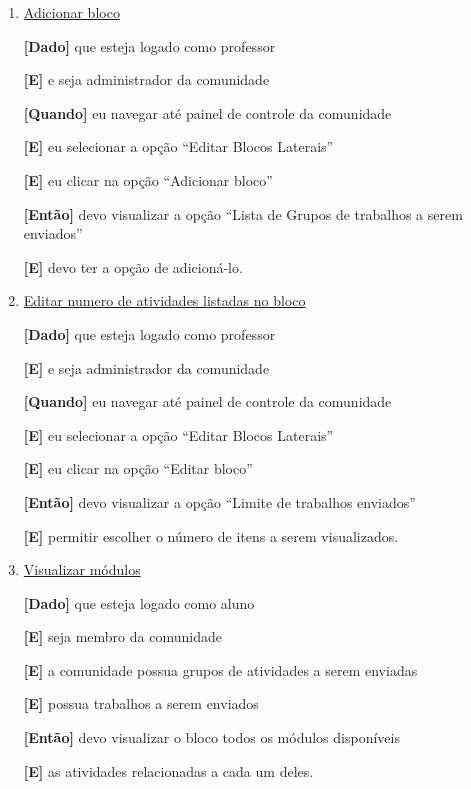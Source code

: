 \begin{enumerate}
\begin{enumerate}

\item \underline{Adicionar bloco}

\textbf{[Dado]} que esteja logado como professor

\textbf{[E]} e seja administrador da comunidade

\textbf{[Quando]} eu navegar até painel de controle da comunidade

\textbf{[E]} eu selecionar a opção ``Editar Blocos Laterais''

\textbf{[E]} eu clicar na opção ``Adicionar bloco''

\textbf{[Então]} devo visualizar a opção ``Lista de Grupos de trabalhos a serem enviados''

\textbf{[E]} devo ter a opção de adicioná-lo.

\item \underline{Editar numero de atividades listadas no bloco}

\textbf{[Dado]} que esteja logado como professor

\textbf{[E]} e seja administrador da comunidade

\textbf{[Quando]} eu navegar até painel de controle da comunidade

\textbf{[E]} eu selecionar a opção ``Editar Blocos Laterais''

\textbf{[E]} eu clicar na opção ``Editar bloco''

\textbf{[Então]} devo visualizar a opção ``Limite de trabalhos enviados''

\textbf{[E]} permitir escolher o número de itens a serem visualizados.

\item \underline{Visualizar módulos}

\textbf{[Dado]} que esteja logado como aluno

\textbf{[E]} seja membro da comunidade

\textbf{[E]} a comunidade possua grupos de atividades a serem enviadas

\textbf{[E]} possua trabalhos a serem enviados

\textbf{[Então]} devo visualizar o bloco todos os módulos disponíveis

\textbf{[E]} as atividades relacionadas a cada um deles.

\end{enumerate}

\end{enumerate}